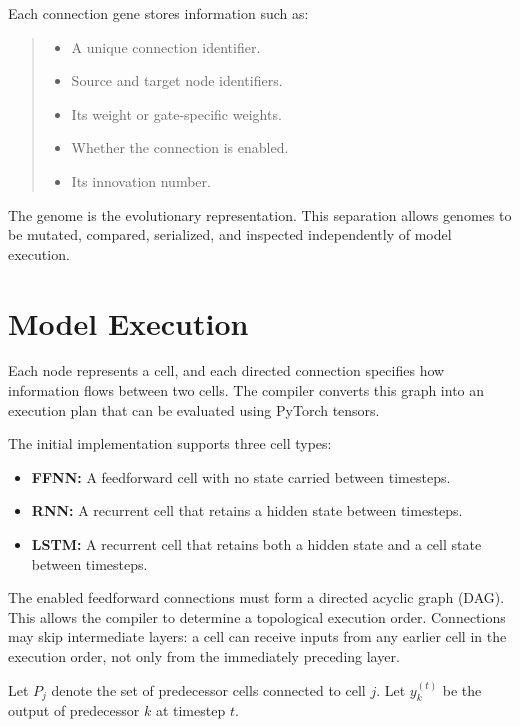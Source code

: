 \documentclass[11pt]{article}
\begin{document}
Each connection gene stores information such as:

\begin{quote}
\begin{itemize}
    \item A unique connection identifier.
    \item Source and target node identifiers.
    \item Its weight or gate-specific weights.
    \item Whether the connection is enabled.
    \item Its innovation number.
\end{itemize}
\end{quote}

The genome is the evolutionary representation. This separation allows genomes to be mutated, compared,
serialized, and inspected independently of model execution.

\section{Model Execution}

Each node represents a
cell, and each directed connection specifies how information flows
between two cells. The compiler converts this graph into an execution
plan that can be evaluated using PyTorch tensors.

The initial implementation supports three cell types:

\begin{itemize}
    \item \textbf{FFNN:} A feedforward cell with no state carried between
    timesteps.
    \item \textbf{RNN:} A recurrent cell that retains a hidden state
    between timesteps.
    \item \textbf{LSTM:} A recurrent cell that retains both a hidden
    state and a cell state between timesteps.
\end{itemize}

The enabled feedforward connections must form a directed acyclic graph
(DAG). This allows the compiler to determine a topological execution
order. Connections may skip intermediate layers: a cell can receive
inputs from any earlier cell in the execution order, not only from the
immediately preceding layer.

Let \(P_j\) denote the set of predecessor cells connected to cell \(j\).
Let \(y_k^{(t)}\) be the output of predecessor \(k\) at timestep \(t\).
\end{document}
